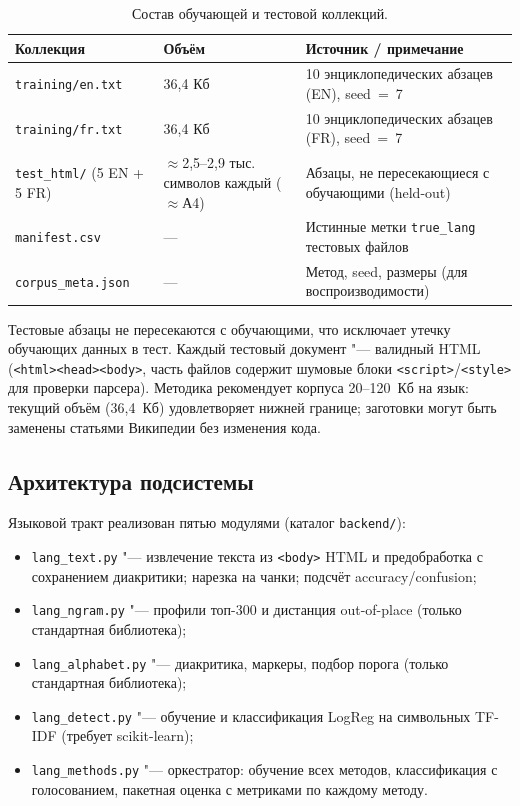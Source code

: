 \begin{table}[H]
	\caption{Состав обучающей и тестовой коллекций.}
	\label{tab:lang_collections}
	\begin{tabular}{|l|l|l|}
		\hline
		Коллекция & Объём & Источник / примечание \\ \hline
		\texttt{training/en.txt} & 36,4 Кб & 10 энциклопедических абзацев (EN), seed~=~7 \\
		\texttt{training/fr.txt} & 36,4 Кб & 10 энциклопедических абзацев (FR), seed~=~7 \\
		\texttt{test\_html/} (5 EN + 5 FR) & $\approx$2,5--2,9 тыс. символов каждый ($\approx$А4) &
		Абзацы, не пересекающиеся с обучающими (held-out) \\
		\texttt{manifest.csv} & --- & Истинные метки \texttt{true\_lang} тестовых файлов \\
		\texttt{corpus\_meta.json} & --- & Метод, seed, размеры (для воспроизводимости) \\ \hline
	\end{tabular}
\end{table}

Тестовые абзацы не пересекаются с обучающими, что исключает утечку
обучающих данных в тест. Каждый тестовый документ "--- валидный HTML
(\texttt{<html><head><body>}, часть файлов содержит шумовые блоки
\texttt{<script>}/\texttt{<style>} для проверки парсера).
Методика рекомендует корпуса 20--120~Кб на язык: текущий объём (36,4~Кб)
удовлетворяет нижней границе; заготовки могут быть заменены статьями
Википедии без изменения кода.

\subsection{Архитектура подсистемы}

Языковой тракт реализован пятью модулями (каталог \texttt{backend/}):

\begin{itemize}
	\item \texttt{lang\_text.py} "--- извлечение текста из \texttt{<body>} HTML и предобработка с сохранением диакритики; нарезка на чанки; подсчёт accuracy/confusion;
	\item \texttt{lang\_ngram.py} "--- профили топ-300 и дистанция out-of-place (только стандартная библиотека);
	\item \texttt{lang\_alphabet.py} "--- диакритика, маркеры, подбор порога (только стандартная библиотека);
	\item \texttt{lang\_detect.py} "--- обучение и классификация LogReg на символьных TF-IDF (требует scikit-learn);
	\item \texttt{lang\_methods.py} "--- оркестратор: обучение всех методов, классификация с голосованием, пакетная оценка с метриками по каждому методу.
\end{itemize}

